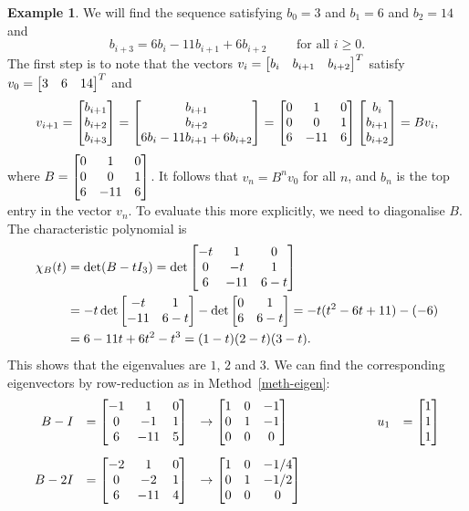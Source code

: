 \documentclass[reqno]{amsart}
\theoremstyle{definition}
\newtheorem{example}[theorem]{Example}
\begin{document}
\begin{example}\label{eg-difference-ii}
 We will find the sequence satisfying $b_0=3$ and $b_1=6$ and
 $b_2=14$ and
 \[ b_{i+3} = 6b_i-11b_{i+1}+6b_{i+2}
     \qquad \text{ for all } i \geq 0. \]
 The first step is to note that the vectors
 $v_i=\left[\begin{matrix} b_i&b_{i+1}&b_{i+2}\end{matrix}\right]^T$ satisfy $v_0=\left[\begin{matrix} 3&6&14\end{matrix}\right]^T$ and
 \[ v_{i+1} =
     \left[\begin{matrix} b_{i+1}\\b_{i+2}\\ b_{i+3}\end{matrix}\right] =
     \left[\begin{matrix} b_{i+1}\\b_{i+2}\\ 6b_i-11b_{i+1}+6b_{i+2}\end{matrix}\right] =
     \left[\begin{matrix} 0&1&0 \\ 0&0&1 \\ 6&-11&6\end{matrix}\right]
      \left[\begin{matrix} b_i \\ b_{i+1}\\ b_{i+2}\end{matrix}\right] =
     B v_i,
 \]
 where $B=\left[\begin{matrix} 0&1&0 \\ 0&0&1 \\ 6&-11&6\end{matrix}\right]$.  It follows that
 $v_n=B^nv_0$ for all $n$, and $b_n$ is the top entry in the vector
 $v_n$.  To evaluate this more explicitly, we need to diagonalise
 $B$.  The characteristic polynomial is
 \begin{align*}
  \chi_B(t)
   &= \det(B-tI_3)
    = \det\left[\begin{matrix} -t&1&0 \\ 0&-t&1 \\ 6&-11&6-t \end{matrix}\right] \\
   &= -t\det\left[\begin{matrix} -t&1\\-11&6-t\end{matrix}\right] - \det\left[\begin{matrix} 0&1\\6&6-t\end{matrix}\right]
    = -t(t^2-6t+11) - (-6) \\
   &= 6-11t+6t^2-t^3 = (1-t)(2-t)(3-t).
 \end{align*}
 This shows that the eigenvalues are $1$, $2$ and $3$.  We can find
 the corresponding eigenvectors by row-reduction as in
 Method~\ref{meth-eigen}:
 \[ \begin{array}{rllcrl}
  B-I  &= \left[\begin{matrix} -1&1&0\\0&-1&1\\6&-11&5 \end{matrix}\right]
       &\to \left[\begin{matrix} 1&0&-1\\0&1&-1\\0&0&0\end{matrix}\right]
       &\hspace{4em}& u_1 &=\left[\begin{matrix} 1\\1\\1\end{matrix}\right] \\[5ex]
  B-2I &= \left[\begin{matrix} -2&1&0\\0&-2&1\\6&-11&4 \end{matrix}\right]
       &\to \left[\begin{matrix} 1&0&-1/4\\0&1&-1/2\\0&0&0\end{matrix}\right]

\end{array}\]
\end{example}
\end{document}

